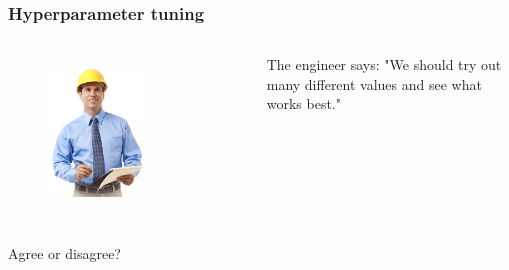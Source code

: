 \begin{frame}
	\frametitle{Hyperparameter tuning}

	\begin{columns}
		\begin{figure}
                	\includegraphics[width=0.6\textwidth]{Pics/engineer.png} \\
        	\end{figure}
		The engineer says: "We should try out many different values and see what works best."
	\end{columns}
	\vskip 0.3cm
	\centering
	Agree or disagree?

\end{frame}

